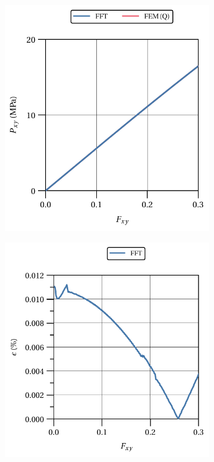 \begin{figure}[hbt]
    \centering
  	\begin{subfigure}[b]{0.49\textwidth}
      \centering
      \includegraphics[width=\textwidth]{figures/hencky_2D_shear_material_response}
      \caption{}
      \label{subfig:hencky_2D_shear_material_response}
    \end{subfigure}
    \begin{subfigure}[b]{0.49\textwidth}
      \centering
      \includegraphics[width=\textwidth]{figures/hencky_2D_shear_material_response_error}

\end{subfigure}
\end{figure}
